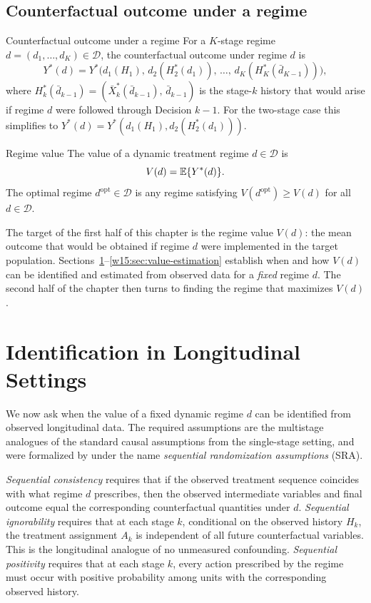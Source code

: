 \documentclass[master.tex]{subfiles}
\begin{document}
\subsection{Counterfactual outcome under a regime}

\begin{defn}{Counterfactual outcome under a regime}
\label{w15:defn:yd}
For a $K$-stage regime $d = (d_1,\ldots,d_K) \in \mathcal{D}$, the counterfactual outcome under regime $d$ is
\[
Y^*(d) = Y^*\!\bigl(d_1(H_1),\, d_2(H_2^*(d_1)),\, \ldots,\, d_K(H_K^*(\bar{d}_{K-1}))\bigr),
\]
where $H_k^*(\bar{d}_{k-1}) = (\bar{X}_k^*(\bar{d}_{k-1}),\, \bar{d}_{k-1})$ is the stage-$k$ history that would arise if regime $d$ were followed through Decision $k-1$. For the two-stage case this simplifies to $Y^*(d) = Y^*(d_1(H_1), d_2(H_2^*(d_1)))$.
\end{defn}

\begin{defn}{Regime value}
\label{w15:defn:regime-value}
The value of a dynamic treatment regime $d \in \mathcal{D}$ is
\[
V(d) = \mathbb{E}\{Y^*(d)\}.
\]
The optimal regime $d^{\mathrm{opt}} \in \mathcal{D}$ is any regime satisfying $V(d^{\mathrm{opt}}) \geq V(d)$ for all $d \in \mathcal{D}$.
\end{defn}

The target of the first half of this chapter is the regime value $V(d)$: the mean outcome that would be obtained if regime $d$ were implemented in the target population. Sections~\ref{w15:sec:identification}--\ref{w15:sec:value-estimation} establish when and how $V(d)$ can be identified and estimated from observed data for a \emph{fixed} regime $d$. The second half of the chapter then turns to finding the regime that maximizes $V(d)$.

\section{Identification in Longitudinal Settings}
\label{w15:sec:identification}

We now ask when the value of a fixed dynamic regime $d$ can be identified from observed longitudinal data. The required assumptions are the multistage analogues of the standard causal assumptions from the single-stage setting, and were formalized by \citet{robins1986new} under the name \emph{sequential randomization assumptions} (SRA).

\emph{Sequential consistency} requires that if the observed treatment sequence coincides with what regime $d$ prescribes, then the observed intermediate variables and final outcome equal the corresponding counterfactual quantities under $d$. \emph{Sequential ignorability} requires that at each stage $k$, conditional on the observed history $H_k$, the treatment assignment $A_k$ is independent of all future counterfactual variables. This is the longitudinal analogue of no unmeasured confounding. \emph{Sequential positivity} requires that at each stage $k$, every action prescribed by the regime must occur with positive probability among units with the corresponding observed history.
\end{document}
